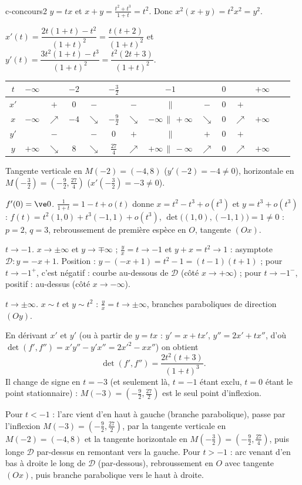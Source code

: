 \begin{corrige}{c-concours2}
 $y=tx$ et $x+y=\frac{t^2+t^3}{1+t}=t^2$. Donc $x^2(x+y)=t^2x^2=y^2$.

 $x'(t)=\dfrac{2t(1+t)-t^2}{(1+t)^2}=\dfrac{t(t+2)}{(1+t)^2}$ et $y'(t)=\dfrac{3t^2(1+t)-t^3}{(1+t)^2}=\dfrac{t^2(2t+3)}{(1+t)^2}$.
\begin{center}
\renewcommand{\arraystretch}{1.25}
\begin{tabular}{c|ccccccccccccc}
$t$ & $-\infty$ & & $-2$ & & $-\frac32$ & & $-1$ & & $0$ & & $+\infty$\\\hline
$x'$ & & $+$ & $0$ & $-$ & & $-$ & $\|$ & $-$ & $0$ & $+$ & \\
$x$ & $-\infty$ & $\nearrow$ & $-4$ & $\searrow$ & $-\frac92$ & $\searrow$ & $-\infty\,\|\,+\infty$ & $\searrow$ & $0$ & $\nearrow$ & $+\infty$\\
$y'$ & & $-$ & & $-$ & $0$ & $+$ & $\|$ & $+$ & $0$ & $+$ & \\
$y$ & $+\infty$ & $\searrow$ & $8$ & $\searrow$ & $\frac{27}4$ & $\nearrow$ & $+\infty\,\|\,-\infty$ & $\nearrow$ & $0$ & $\nearrow$ & $+\infty$
\end{tabular}
\end{center}
Tangente verticale en $M(-2)=(-4,8)$ ($y'(-2)=-4\neq0$), horizontale en $M\left(-\frac32\right)=\left(-\frac92,\frac{27}4\right)$ ($x'\left(-\frac32\right)=-3\neq0$).

 $f'(0)=\ve0$. $\frac1{1+t}=1-t+o(t)$ donne $x=t^2-t^3+o(t^3)$ et $y=t^3+o(t^3)$ :
$f(t)=t^2(1,0)+t^3(-1,1)+o(t^3)$, $\det\big((1,0),(-1,1)\big)=1\neq0$ : $p=2$, $q=3$, rebroussement de première espèce en $O$, tangente $(Ox)$.

 \emph{$t\to-1$.} $x\to\pm\infty$ et $y\to\mp\infty$ ; $\frac yx=t\to-1$ et $y+x=t^2\to1$ : asymptote $\mathcal D:y=-x+1$. Position : $y-(-x+1)=t^2-1=(t-1)(t+1)$ ; pour $t\to-1^+$, c'est négatif : courbe au-dessous de $\mathcal D$ (côté $x\to+\infty$) ; pour $t\to-1^-$, positif : au-dessus (côté $x\to-\infty$).

\emph{$t\to\pm\infty$.} $x\sim t$ et $y\sim t^2$ : $\frac yx=t\to\pm\infty$, branches paraboliques de direction $(Oy)$.

 En dérivant $x'$ et $y'$ (ou à partir de $y=tx$ : $y'=x+tx'$, $y''=2x'+tx''$, d'où $\det(f',f'')=x'y''-y'x''=2x'^2-xx''$) on obtient
\[\det(f',f'')=\frac{2t^2(t+3)}{(1+t)^3}.\]
Il change de signe en $t=-3$ (et seulement là, $t=-1$ étant exclu, $t=0$ étant le point stationnaire) : $M(-3)=\left(-\frac92,\frac{27}2\right)$ est le seul point d'inflexion.

 Pour $t<-1$ : l'arc vient d'en haut à gauche (branche parabolique), passe par l'inflexion $M(-3)=\left(-\frac92,\frac{27}2\right)$, par la tangente verticale en $M(-2)=(-4,8)$ et la tangente horizontale en $M\left(-\frac32\right)=\left(-\frac92,\frac{27}4\right)$, puis longe $\mathcal D$ par-dessus en remontant vers la gauche. Pour $t>-1$ : arc venant d'en bas à droite le long de $\mathcal D$ (par-dessous), rebroussement en $O$ avec tangente $(Ox)$, puis branche parabolique vers le haut à droite.
\end{corrige}

